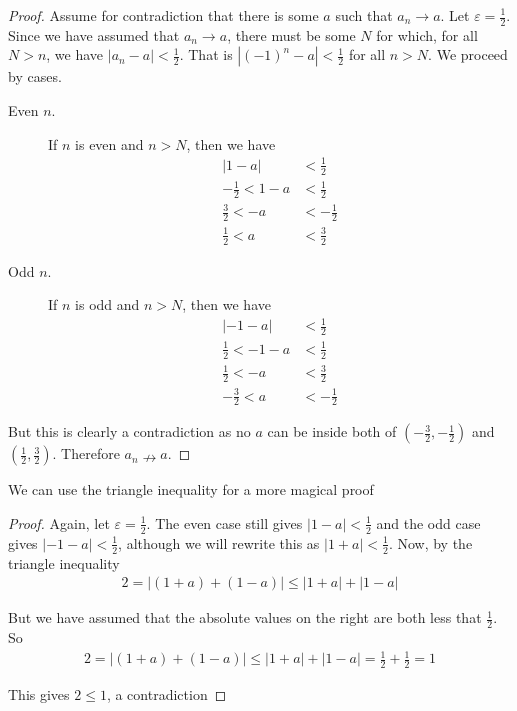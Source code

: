 \documentclass{article}
\begin{document}
\begin{proof}
	Assume for contradiction that there is some $a$ such that $a_n \rightarrow a$. Let $\varepsilon = \tfrac{1}{2}$. Since we have assumed that
	$a_n \rightarrow a$, there must be some $N$ for which, for all $N > n$, we have $|a_n - a| < \frac{1}{2}$. That is $|(-1)^n - a| < \frac{1}{2}$ for all $n > N$.
	We proceed by cases.

	\begin{description}
		\item[Even $n$.]
		      If $n$ is even and $n > N$, then we have
		      \begin{align*}
			      \left\lvert1 - a\right\rvert & < \frac{1}{2}  \\
			      -\frac{1}{2} < 1 - a         & < \frac{1}{2}  \\
			      \frac{3}{2} < -a             & < -\frac{1}{2} \\
			      \frac {1}{2} < a             & < \frac{3}{2}
		      \end{align*}
		\item[Odd $n$.]
		      If $n$ is odd and $n > N$, then we have
		      \begin{align*}
			      \left\lvert-1 - a\right\rvert & < \frac{1}{2}  \\
			      \frac{1}{2} < -1 -a           & < \frac{1}{2}  \\
			      \frac{1}{2} < -a              & < \frac{3}{2}  \\
			      -\frac{3}{2} < a              & < -\frac{1}{2}
		      \end{align*}
	\end{description}

	But this is clearly a contradiction as no $a$ can be inside both of $(-\frac{3}{2}, -\frac{1}{2})$ and $(\frac{1}{2}, \frac{3}{2})$.
	Therefore $a_n \nrightarrow a$.
\end{proof}

We can use the triangle inequality for a more magical proof
\begin{proof}
	Again, let $\varepsilon = \frac{1}{2}$. The even case still gives $\left\lvert1 - a\right\rvert < \frac{1}{2}$ and the odd case
	gives $\left\lvert-1 - a\right\rvert < \frac{1}{2}$, although we will rewrite this as $\left\lvert1 + a\right\rvert < \frac{1}{2}$.
	Now, by the triangle inequality
	\begin{align*}
		2 = \left\lvert(1 + a) + (1 - a)\right\rvert \le |1 + a| + |1 - a|
	\end{align*}

	But we have assumed that the absolute values on the right are both less that $\frac{1}{2}$. So
	\begin{align*}
		2 = \left\lvert(1 + a) + (1 - a)\right\rvert \le |1 + a| + |1 - a| = \frac{1}{2} + \frac{1}{2} = 1
	\end{align*}

	This gives $2 \le 1$, a contradiction
\end{proof}
\end{document}
